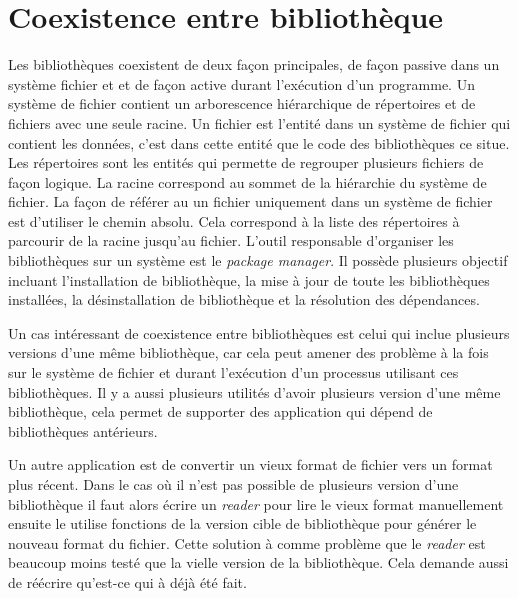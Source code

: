 \section{Coexistence entre bibliothèque}
Les bibliothèques coexistent de deux façon principales, de façon passive dans
un système fichier et et de façon active durant l'exécution d'un programme.  Un
système de fichier contient un arborescence hiérarchique de répertoires et de
fichiers avec une seule racine. Un fichier est l'entité dans un système de
fichier qui contient les données, c'est dans cette entité que le code des
bibliothèques ce situe.  Les répertoires sont les entités qui permette de
regrouper plusieurs fichiers de façon logique. La racine correspond au sommet
de la hiérarchie du système de fichier. La façon de référer au un fichier
uniquement dans un système de fichier est d'utiliser le chemin absolu. Cela
correspond à la liste des répertoires à parcourir de la racine jusqu'au
fichier. L'outil responsable d'organiser les bibliothèques sur un système
est le \textit{package manager}. Il possède plusieurs objectif incluant
l'installation de bibliothèque, la mise à jour de toute les bibliothèques
installées, la désinstallation de bibliothèque et la résolution des dépendances.

Un cas intéressant de coexistence entre bibliothèques est celui qui inclue
plusieurs versions d'une même bibliothèque, car cela peut amener des problème
à la fois sur le système de fichier et durant l'exécution d'un processus utilisant
ces bibliothèques. Il y a aussi plusieurs utilités d'avoir plusieurs version
d'une même bibliothèque, cela permet de supporter des application qui dépend de
bibliothèques antérieurs.

Un autre application est de convertir un vieux format de fichier vers un format
plus récent. Dans le cas où il n'est pas possible de plusieurs version d'une bibliothèque
il faut alors écrire un \textit{reader} pour lire le vieux format manuellement ensuite le
utilise fonctions de la version cible de bibliothèque pour générer le nouveau format du fichier.
Cette solution à comme problème que le \textit{reader} est beaucoup moins testé que la
vielle version de la bibliothèque. Cela demande aussi de réécrire qu'est-ce qui à déjà été fait.

